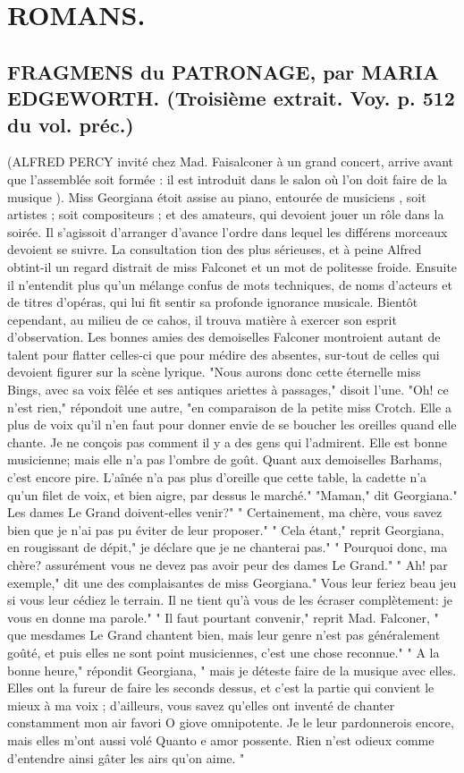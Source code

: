 \setcounter{page}{112}
\chapter{ROMANS.}
\section{FRAGMENS du PATRONAGE, par MARIA EDGEWORTH. \large{(Troisième extrait. Voy. p. 512 du vol. préc.)}}
(ALFRED PERCY invité chez Mad. Faisalconer à un grand concert, arrive avant que l'assemblée soit formée : il est introduit dans le salon où l'on doit faire de la musique ). Miss Georgiana étoit assise au piano, entourée de musiciens , soit artistes ; soit compositeurs ; et des amateurs, qui devoient jouer un rôle dans la soirée. Il s'agissoit d'arranger d'avance l'ordre dans lequel les différens morceaux devoient se suivre. La consultation\setcounter{page}{113} tion des plus sérieuses, et à peine Alfred obtint-il un regard distrait de miss Falconet et un mot de politesse froide. Ensuite il n’entendit plus qu’un mélange confus de mots techniques, de noms d’acteurs et de titres d’opéras, qui lui fit sentir sa profonde ignorance musicale. Bientôt cependant, au milieu de ce cahos, il trouva matière à exercer son esprit d’observation. Les bonnes amies des demoiselles Falconer montroient autant de talent pour flatter celles-ci que pour médire des absentes, sur-tout de celles qui devoient figurer sur la scène lyrique.
"Nous aurons donc cette éternelle miss Bings, avec sa voix fêlée et ses antiques ariettes à passages," disoit l’une.
"Oh! ce n’est rien," répondoit une autre, "en comparaison de la petite miss Crotch. Elle a plus de voix qu’il n’en faut pour donner envie de se boucher les oreilles quand elle chante. Je ne conçois pas comment il y a des gens qui l’admirent. Elle est bonne musicienne; mais elle n’a pas l’ombre de goût. Quant aux demoiselles Barhams, c’est encore pire. L’aînée n’a pas plus d’oreille que cette table, la cadette n’a qu’un filet de voix, et bien aigre, par dessus le marché."\setcounter{page}{114} "Maman," dit Georgiana." Les dames Le Grand doivent-elles venir?" " Certainement, ma chère, vous savez bien que je n'ai pas pu éviter de leur proposer." " Cela étant," reprit Georgiana, en rougissant de dépit," je déclare que je ne chanterai pas." " Pourquoi donc, ma chère? assurément vous ne devez pas avoir peur des dames Le Grand." " Ah! par exemple," dit une des complaisantes de miss Georgiana." Vous leur feriez beau jeu si vous leur cédiez le terrain. Il ne tient qu'à vous de les écraser complètement: je vous en donne ma parole." " Il faut pourtant convenir," reprit Mad. Falconer, " que mesdames Le Grand chantent bien, mais leur genre n'est pas généralement goûté, et puis elles ne sont point musiciennes, c'est une chose reconnue." " A la bonne heure," répondit Georgiana, " mais je déteste faire de la musique avec elles. Elles ont la fureur de faire les seconds dessus, et c'est la partie qui convient le mieux à ma voix ; d'ailleurs, vous savez qu'elles ont inventé de chanter constamment mon air favori O giove omnipotente. Je le leur pardonnerois encore, mais elles m'ont\setcounter{page}{115} aussi volé Quanto e amor possente. Rien n'est odieux comme d'entendre ainsi gâter les airs qu'on aime. "
